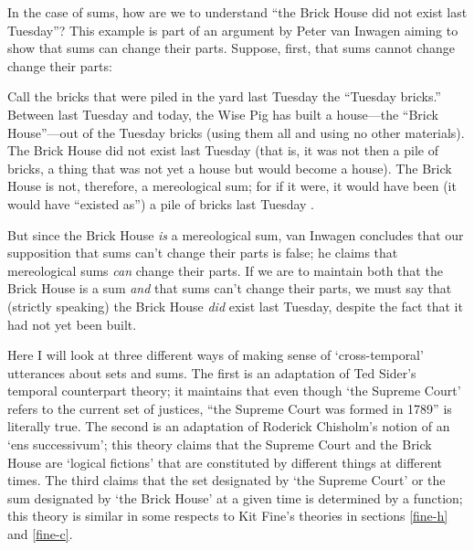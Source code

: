 \documentclass[11pt]{article}
\newenvironment{squote}{%
\begin{spacing}{1}
\begin{list}{}{%
\setlength{\labelwidth}{0pt}%
\rightmargin\leftmargin%
}
\item\relax
}{%
\end{list}%
\end{spacing}
}
\begin{document}
\begin{spacing}{1.5}
In the case of sums, how are we to understand ``the Brick House did
not exist last Tuesday''?  This example is part of an argument by
Peter van Inwagen aiming to show that sums can change their parts.
Suppose, first, that sums cannot change change their parts:

\begin{squote}
Call the bricks that were piled in the yard last Tuesday the ``Tuesday
bricks.''  Between last Tuesday and today, the Wise Pig has built a
house---the ``Brick House''---out of the Tuesday bricks (using them
all and using no other materials).  The Brick House did not exist last
Tuesday (that is, it was not then a pile of bricks, a thing that was
not yet a house but would become a house).  The Brick House is not,
therefore, a mereological sum; for if it were, it would have been (it
would have ``existed as'') a pile of bricks last Tuesday
\citeyearpar[616]{inwagen2006}.
\end{squote}

But since the Brick House {\em is} a mereological sum, van Inwagen
concludes that our supposition that sums can't change their parts is
false; he claims that mereological sums {\em can} change their parts.
If we are to maintain both that the Brick House is a sum {\em and}
that sums can't change their parts, we must say that (strictly
speaking) the Brick House {\em did} exist last Tuesday, despite the
fact that it had not yet been built.


Here I will look at three different ways of making sense of
`cross-temporal' utterances about sets and sums.  The first is an
adaptation of Ted Sider's temporal counterpart theory; it maintains
that even though `the Supreme Court' refers to the current set of
justices, ``the Supreme Court was formed in 1789'' is literally true.
The second is an adaptation of Roderick Chisholm's notion of an `ens
successivum'; this theory claims that the Supreme Court and the Brick
House are `logical fictions' that are constituted by different things
at different times.  The third claims that the set designated by `the
Supreme Court' or the sum designated by `the Brick House' at a given
time is determined by a function; this theory is similar in some
respects to Kit Fine's theories in sections \ref{fine-h} and
\ref{fine-c}.


\end{spacing}
\end{document}

